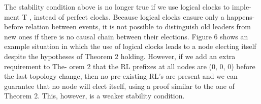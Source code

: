 The stability condition above is no longer true if we use logical clocks to imple- ment T , instead of perfect clocks. Because logical clocks ensure only a happens- before relation between events, it is not possible to distinguish old leaders from new ones if there is no causal chain between their elections. Figure 6 shows an example situation in which the use of logical clocks leads to a node electing itself despite the hypotheses of Theorem 2 holding. However, if we add an extra requirement to The- orem 2 that the RL prefixes at all nodes are (0, 0, 0) before the last topology change, then no pre-existing RL’s are present and we can guarantee that no node will elect itself, using a proof similar to the one of Theorem 2. This, however, is a weaker stability condition.
